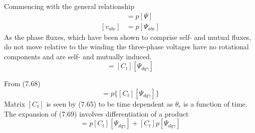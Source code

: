 \documentclass[a4paper,numbers=noenddot,12pt]{scrbook}
\begin{document}
        Commencing with the general relationship
        \begin{align}
            [v] & = p[\varPsi] \nonumber \\
            [v_{abc}] & = p [\varPsi_{abc}]
            \label{eq:Eq7.68}
        \end{align}
        As the phase fluxes, which have been shown to comprise self- and mutual fluxes, do not move relative to the winding the three-phase voltages have no rotational components and are self- and mutually induced.
        \begin{equation*}
            [\varPsi_{abc}] = [C_t] [\varPsi_{dq\gamma}]
        \end{equation*}

        From (7.68)
        \begin{equation}
            [v_{abc}] = p\{[C_t] [\varPsi_{dq\gamma}]\}
            \label{eq:Eq7.69}
        \end{equation}
        Matrix $[C_t]$ is seen by (7.65) to be time dependent as $\theta_r$ is a function of time. The expansion of (7.69) involves differentiation of a product
        \begin{equation*}
            [v_{abc}] = {p[C_t]}[\varPsi_{d q \gamma}] + [C_t]{p[\varPsi_{dq\gamma}]}
        \end{equation*}
\end{document}
